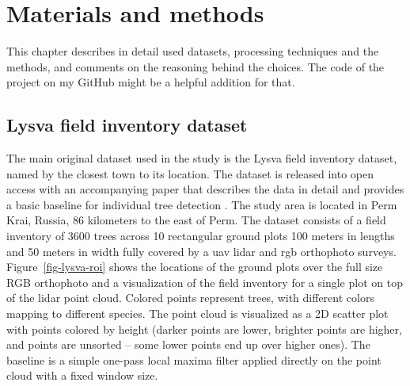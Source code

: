 \chapter{Materials and methods}\label{cap:materials}

This chapter describes in detail used datasets, processing techniques and the methods, and comments on the reasoning behind the choices.
The code of the project on my GitHub might be a helpful addition for that.


\section{Lysva field inventory dataset}\label{sec-lysva-dataset}

The main original dataset used in the study is the Lysva field inventory dataset, named by the closest town to its location.
The dataset is released into open access with an accompanying paper that describes the data in detail and provides a basic baseline for individual tree detection \citep{dubrovinExplorationPropertiesPoint2024}.
The study area is located in Perm Krai, Russia, 86 kilometers to the east of Perm.
The dataset consists of a field inventory of 3600 trees across 10 rectangular ground plots 100 meters in lengths and 50 meters in width fully covered by a \gls{uav} \gls{lidar} and \gls{rgb} orthophoto surveys.
Figure~\ref{fig-lysva-roi} shows the locations of the ground plots over the full size RGB orthophoto and a visualization of the field inventory for a single plot on top of the \gls{lidar} point cloud.
Colored points represent trees, with different colors mapping to different species.
The point cloud is visualized as a 2D scatter plot with points colored by height (darker points are lower, brighter points are higher, and points are unsorted – some lower points end up over higher ones).
The baseline is a simple one-pass local maxima filter applied directly on the point cloud with a fixed window size.

